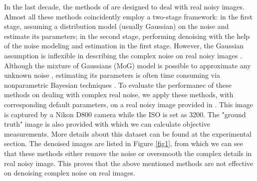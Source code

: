 \documentclass[10pt,twocolumn,letterpaper]{article}
\begin{document}
In the last decade, the methods of \cite{fullyblind,rabie2005robust,Liu2008,almapg,noiseclinic,Zhu_2016_CVPR,crosschannel2016} are designed to deal with real noisy images. Almost all these methods coincidently employ a two-stage framework: in the first stage, assuming a distribution model (usually Gaussian) on the noise and estimate its parameters; in the second stage, performing denoising with the help of the noise modeling and estimation in the first stage. However, the Gaussian assumption is inflexible in describing the complex noise on real noisy images \cite{Liu2008}. Although the mixture of Gaussians (MoG) model is possible to approximate any unknown noise \cite{Zhu_2016_CVPR}, estimating its parameters is often time consuming via nonparametric Bayesian techniques \cite{Zhu_2016_CVPR,Bishop}. To evaluate the performanec of these methods on dealing with complex real noise, we apply these methods, with corresponding default parameters, on a real noisy image provided in \cite{crosschannel2016}. This image is captured by a Nikon D800 camera while the ISO is set as 3200. The "ground truth" image is also provided with which we can calculate objective measurements. More details about this dataset can be found at the experimental section. The denoised images are listed in Figure \ref{fig1}, from which we can see that these methods either remove the noise or oversmooth the complex details in real noisy image. This proves that the above mentioned methods are not effective on denoising complex noise on real images. 
\end{document}
